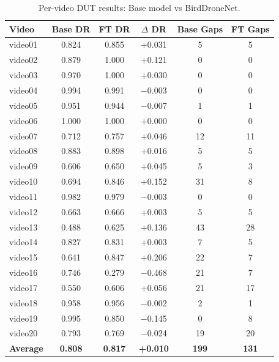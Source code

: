 \documentclass[12pt,a4paper]{report}
\renewcommand{\arraystretch}{1.1}
\begin{document}
\begin{table}[H]
\centering
\caption[Per-video DUT results]{Per-video DUT results: Base model vs BirdDroneNet.}
\label{tab:per_video}
\small
\renewcommand{\arraystretch}{0.9}
\begin{tabular}{|l|c|c|c|c|c|}
\hline
\rowcolor{gray!20}
\textbf{Video} & \textbf{Base DR} & \textbf{FT DR} & \textbf{$\Delta$ DR} & \textbf{Base Gaps} & \textbf{FT Gaps} \\
\hline
video01 & 0.824 & 0.855 & +0.031 & 5  & 5  \\
\hline
video02 & 0.879 & 1.000 & +0.121 & 0  & 0  \\
\hline
video03 & 0.970 & 1.000 & +0.030 & 0  & 0  \\
\hline
video04 & 0.994 & 0.991 & $-$0.003 & 0  & 0  \\
\hline
video05 & 0.951 & 0.944 & $-$0.007 & 1  & 1  \\
\hline
video06 & 1.000 & 1.000 & +0.000 & 0  & 0  \\
\hline
video07 & 0.712 & 0.757 & +0.046 & 12 & 11 \\
\hline
video08 & 0.883 & 0.898 & +0.016 & 5  & 5  \\
\hline
video09 & 0.606 & 0.650 & +0.045 & 5  & 3  \\
\hline
video10 & 0.694 & 0.846 & +0.152 & 31 & 8  \\
\hline
video11 & 0.982 & 0.979 & $-$0.003 & 0  & 0  \\
\hline
video12 & 0.663 & 0.666 & +0.003 & 5  & 5  \\
\hline
video13 & 0.488 & 0.625 & +0.136 & 43 & 28 \\
\hline
video14 & 0.827 & 0.831 & +0.003 & 7  & 5  \\
\hline
video15 & 0.641 & 0.847 & +0.206 & 22 & 7  \\
\hline
video16 & 0.746 & 0.279 & $-$0.468 & 21 & 7  \\
\hline
video17 & 0.550 & 0.606 & +0.056 & 21 & 17 \\
\hline
video18 & 0.958 & 0.956 & $-$0.002 & 2  & 1  \\
\hline
video19 & 0.995 & 0.850 & $-$0.145 & 0  & 8  \\
\hline
video20 & 0.793 & 0.769 & $-$0.024 & 19 & 20 \\
\hline
\textbf{Average} & \textbf{0.808} & \textbf{0.817} & \textbf{+0.010} & \textbf{199} & \textbf{131} \\
\hline
\end{tabular}
\end{table}
\end{document}
